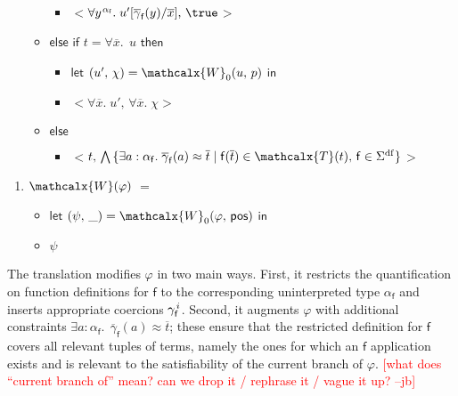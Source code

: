 \documentclass[runningheads,a4paper]{llncs}
\newcommand\return{}
\newcommand\bigtuple[1]{$\bigl<${#1}$\bigr>$}
\newcommand{\con}[1]{\mathsf{#1}}
\renewcommand\vec[1]{\overline{#1}}
\let\oldSigma=\Sigma
\def\Sigma{\mathrm{\oldSigma}}
\newcommand{\teq}{\approx}
\newcommand{\terms}{\mathcalx{T}}
\newcommand{\conv}{\mathcalx{W}}
\newcommand{\sfundefs}[1]{#1^\mathrm{df}}
\newcommand{\ptrue}{\con{pos}}
\newcommand\concret{\gamma} %
\newcommand{\vecfarg}[1]{\vec{\concret}_{#1}}
\newcommand{\fargx}[2]{\concret^{\vthinspace#2}_{#1}}
\newcommand{\fargsort}[1]{\alpha_{#1}}
\newcommand{\rem}[1]{\textcolor{red}{[#1]}}
\newcommand{\jb}[1]{\rem{#1 --jb}}
\newcommand{\vthinspace}{\kern+0.083333em}
\newcommand{\typ}[1]{^{\vthinspace #1}}
\begin{document}
\begin{enumerate}
\begin{itemize}
\begin{itemize}
      \item[] \return \bigtuple{$\forall y\typ{\fargsort{\con{f}}}.\; u' [ \vecfarg{\con{f}}( y ) / \vec x ],\, \true$}
    \end{itemize}
  \item[] $\mathsf{else}$ $\mathsf{if}$ $t = \forall \vec x.\;\, u$ $\mathsf{then}$
    \begin{itemize}
      \item[] $\mathsf{let}$ $( u',\, \chi ) = \conv_0( u,\, p )$ $\mathsf{in}$
      \item[] \return \bigtuple{$\forall \vec x.\; u',\, \forall \vec x.\; \chi$}
    \end{itemize}
   \item[] $\mathsf{else}$
   \begin{itemize}
     \item[] \return \bigtuple{$t,\, \bigwedge\, \{ \exists a : \fargsort{\con{f}}.\; \vecfarg{\con{f}}( a ) \teq \vec t \mid \con{f}( \vec t ) \in \terms( t ),\, \con{f} \in \sfundefs{\Sigma} \}$}
   \end{itemize}
 \end{itemize}
\end{enumerate}
\begin{enumerate}
\item[\ ] 
$\conv( \varphi )$ $=$
 \begin{itemize}
   \item[] $\mathsf{let}$ $( \psi,\, \_ ) = \conv_0( \varphi,\, \ptrue )$ $\mathsf{in}$
   \item[] \return $\psi$
  \end{itemize}
\end{enumerate}


The translation modifies $\varphi$ in two main ways. First, it restricts the
quantification on function definitions for $\con{f}$ to the corresponding
uninterpreted type $\fargsort{\con{f}}$ and inserts appropriate coercions
$\fargx{\con{f}}{i}$. Second, it augments $\varphi$ with additional constraints
$\exists a : \fargsort{\con{f}}.\;\, \vecfarg{\con{f}}( a ) \teq \vec t$; these
ensure that the restricted definition for $\con{f}$ covers all relevant tuples
of terms, namely the ones for which an $\con{f}$ application exists and is
relevant to the satisfiability of the current branch of $\varphi$.
\jb{what does ``current branch of'' mean? can we drop it / rephrase it / vague
it up?}
\end{document}

